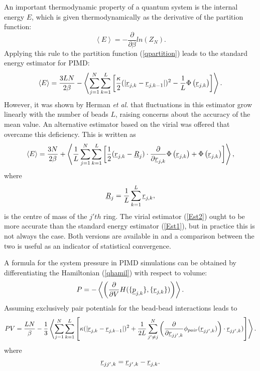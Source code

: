 An important thermodynamic property of a quantum system is the
internal energy $E$, which is given thermodynamically as the
derivative of the partition function:
\begin{equation}
  \left \langle E \right \rangle =-\frac{\partial}{\partial \beta} ln (Z_{N}). 
\end{equation}
Applying this rule to the partition function (\ref{qpartition}) leads
to the standard energy estimator for PIMD:
\begin{equation}
  \left \langle E \right \rangle =\frac{3LN}{2 \beta}- \left \langle
  \sum_{j=1}^{N} \sum_{k=1}^{L} \left [ \frac{\kappa}{2} (| \mbox{$\underline{ r}$}_{j,k}-\mbox{$\underline{
      r}$}_{j,k-1}| )^{2} -\frac{1}{L} \Phi\left (\mbox{$\underline{ r}$}_{j,k} \right ) \right ]  \right \rangle .
  \label{Est1}
\end{equation}
However, it was shown by Herman {\em et al.} \cite{herman-82a} that
fluctuations in this estimator grow linearly with the number of beads
$L$, raising concerns about the accuracy of the mean value. An
alternative estimator based on the virial was offered that overcame this
deficiency. This is written as
\begin{equation}
  \left \langle E \right \rangle =\frac{3N}{2 \beta}+ \left \langle \frac{1}{L}
  \sum_{j=1}^{N} \sum_{k=1}^{L} \left [ \frac{1}{2} (\mbox{$\underline{ r}$}_{j,k}-\mbox{$\underline{
      R}$}_{j} )\cdot \frac{\partial}{\partial \mbox{$\underline{r}$}_{j,k}}\Phi \left (\mbox{$\underline{ r}$}_{j,k} \right )+
    \Phi \left (\mbox{$\underline{ r}$}_{j,k} \right )\right ]  \right \rangle , \label{Est2}
\end{equation}
where
\begin{equation}
  \mbox{$\underline{R}$}_{j}=\frac{1}{L} \sum_{k=1}^{L} \mbox{$\underline{r}$}_{j,k}, \label{qcom}
\end{equation}
is the centre of mass of the $j'th$ ring. The virial estimator
(\ref{Est2}) ought to be more accurate than the standard energy
estimator (\ref{Est1}), but in practice this is not always the
case. Both versions are available in \DD{} and a comparison between the
two is useful as an indicator of statistical convergence.

A formula for the system pressure in PIMD simulations can be obtained
by differentiating the Hamiltonian (\ref{qhamil}) with respect to volume:
\begin{equation}
  P=-\left \langle \left ( \frac{\partial}{\partial V}H(\{\mbox{$\underline{p}$}_{j,k}\},\{\mbox{$\underline{r}$}_{j,k}\})
     \right ) \right \rangle .
\end{equation}
Assuming exclusively pair potentials for the bead-bead interactions leads to
\begin{equation}
  PV=\frac{LN}{\beta}-\frac{1}{3} \left \langle \sum_{j=1}^{N} \sum_{k=1}^{L}
  \left [ \kappa (| \mbox{$\underline{r}$}_{j,k}-\mbox{$\underline{r}$}_{j,k-1} |)^{2}+\frac{1}{2L} \sum_{j' \ne j}^{N}
    \left ( \frac{\partial}{\partial \mbox{$\underline{r}$}_{jj',k}}\phi_{pair}(\mbox{$\underline{ r}$}_{jj',k}) 
    \right )\cdot \mbox{$\underline{ r}$}_{jj',k}) \right ] \right \rangle .
\end{equation}
where
\begin{equation}
  \mbox{$\underline{r}$}_{jj',k}=\mbox{$\underline{r}$}_{j',k}-\mbox{$\underline{r}$}_{j,k} .
\end{equation}

